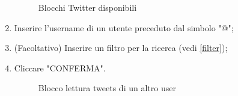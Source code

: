 \begin{enumerate}
\begin{figure}[!ht]
		\caption{Blocchi Twitter disponibili}
	\end{figure}
	\newpage
	\item Inserire l'username di un utente preceduto dal simbolo "@";
	\item (Facoltativo) Inserire un filtro per la ricerca (vedi \ref{filter});
	\item Cliccare "CONFERMA".
	\begin{figure}[!ht]
		\centering
		\caption{Blocco lettura tweets di un altro user}
	\end{figure}
\end{enumerate}
\newpage
